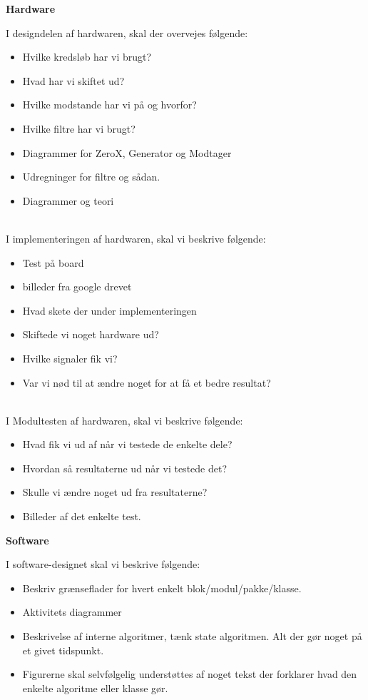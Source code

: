 \documentclass[11pt]{article}
\begin{document}
\textbf{Hardware
}

I designdelen af hardwaren, skal der overvejes følgende:

\begin{itemize}
	\item Hvilke kredsløb har vi brugt? 
	\item Hvad har vi skiftet ud?
	\item Hvilke modstande har vi på og hvorfor?
	\item Hvilke filtre har vi brugt? 
	\item Diagrammer for ZeroX, Generator og Modtager
	\item Udregninger for filtre og sådan.
	\item Diagrammer og teori
\end{itemize}

\\
I implementeringen af hardwaren, skal vi beskrive følgende:

\begin{itemize}
	\item Test på board
	\item billeder fra google drevet
	\item Hvad skete der under implementeringen
	\item Skiftede vi noget hardware ud?
	\item Hvilke signaler fik vi?
	\item Var vi nød til at ændre noget for at få et bedre resultat?
\end{itemize}

\\
I Modultesten af hardwaren, skal vi beskrive følgende:

\begin{itemize}
	\item Hvad fik vi ud af når vi testede de enkelte dele?
	\item Hvordan så resultaterne ud når vi testede det?
	\item Skulle vi ændre noget ud fra resultaterne?
	\item Billeder af det enkelte test.
\end{itemize}

\textbf{Software}

I software-designet skal vi beskrive følgende:

\begin{itemize}
	\item Beskriv grænseflader for hvert enkelt blok/modul/pakke/klasse.
	\item Aktivitets diagrammer
	\item Beskrivelse af interne algoritmer, tænk state algoritmen. Alt der gør noget på et givet tidspunkt.
	\item Figurerne skal selvfølgelig understøttes af noget tekst der forklarer hvad den enkelte algoritme eller klasse gør.
\end{itemize}
\end{document}
